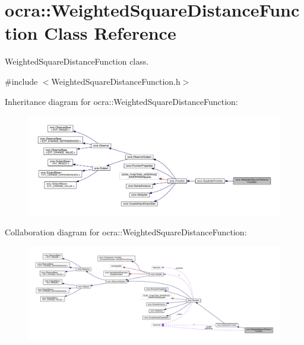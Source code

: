 \hypertarget{classocra_1_1WeightedSquareDistanceFunction}{}\section{ocra\+:\+:Weighted\+Square\+Distance\+Function Class Reference}
\label{classocra_1_1WeightedSquareDistanceFunction}


Weighted\+Square\+Distance\+Function class.  




{\ttfamily \#include $<$Weighted\+Square\+Distance\+Function.\+h$>$}



Inheritance diagram for ocra\+:\+:Weighted\+Square\+Distance\+Function\+:\nopagebreak
\begin{figure}[H]
\begin{center}
\leavevmode
\includegraphics[width=350pt]{d8/dff/classocra_1_1WeightedSquareDistanceFunction__inherit__graph}
\end{center}
\end{figure}


Collaboration diagram for ocra\+:\+:Weighted\+Square\+Distance\+Function\+:\nopagebreak
\begin{figure}[H]
\begin{center}
\leavevmode
\includegraphics[width=350pt]{d4/d37/classocra_1_1WeightedSquareDistanceFunction__coll__graph}
\end{center}
\end{figure}
